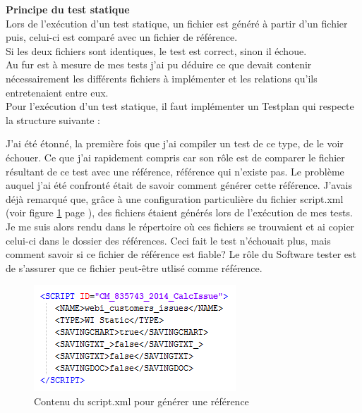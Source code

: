 \textbf{Principe du test statique}\hfill \\ \indent
Lors de l'ex\'{e}cution d'un test statique, un fichier est g\'{e}n\'{e}r\'{e} \`{a} partir d'un fichier puis, celui-ci est compar\'{e} avec un fichier de r\'{e}f\'{e}rence.\\
Si les deux fichiers sont identiques, le test est correct, sinon il \'{e}choue.\\
Au fur est \`{a} mesure de mes tests j'ai pu d\'{e}duire ce que devait contenir n\'{e}cessairement les diff\'{e}rents fichiers \`{a} impl\'{e}menter et les relations qu'ils entretenaient entre eux.\\
Pour l'ex\'{e}cution d'un test statique, il faut impl\'{e}menter un \gls{Testplan} qui respecte la structure suivante :



J'ai \'{e}t\'{e} \'{e}tonn\'{e}, la premi\`{e}re fois que j'ai compiler un test de ce type, de le voir \'{e}chouer. Ce que j'ai rapidement compris car son r\^{o}le est de comparer le fichier r\'{e}sultant de ce test avec une r\'{e}f\'{e}rence, r\'{e}f\'{e}rence qui n'existe pas. Le probl\`{e}me auquel j'ai \'{e}t\'{e} confront\'{e} \'{e}tait de savoir comment g\'{e}n\'{e}rer cette r\'{e}f\'{e}rence. J'avais d\'{e}j\`{a} remarqu\'{e} que, gr\^{a}ce \`{a} une configuration particuli\`{e}re du fichier script.xml (voir figure \ref{figure:scriptXmlSavingRef} page \pageref{figure:scriptXmlSavingRef}), des fichiers \'{e}taient g\'{e}n\'{e}r\'{e}s lors de l'ex\'{e}cution de mes tests. Je me suis alors rendu dans le r\'{e}pertoire o\`{u} ces fichiers se trouvaient et ai copier celui-ci dans le dossier des r\'{e}f\'{e}rences. Ceci fait le test n'\'{e}chouait plus, mais comment savoir si ce fichier de r\'{e}f\'{e}rence est fiable? Le r\^{o}le du \gls{Software tester} est de s'assurer que ce fichier peut-\^{e}tre utlis\'{e} comme r\'{e}f\'{e}rence.\\

\begin{figure}[!ht]
  \centering
      \includegraphics{images/scriptXmlSavingRef.png}
  \caption{Contenu du script.xml pour g\'{e}n\'{e}rer une r\'{e}f\'{e}rence}
	\label{figure:scriptXmlSavingRef}
\end{figure}



